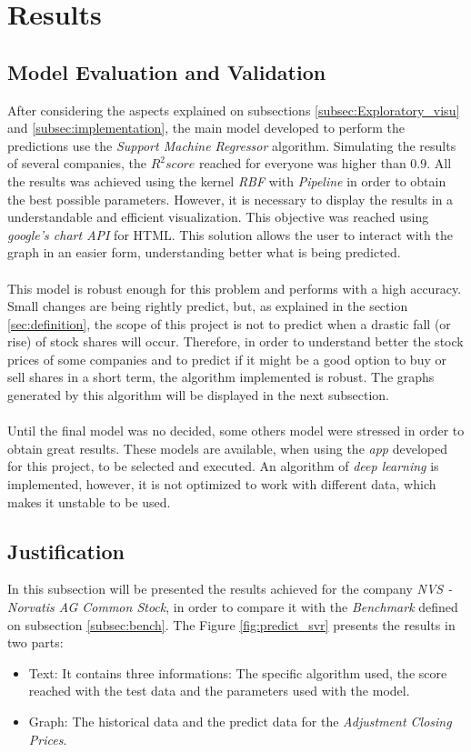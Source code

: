 \section{Results}
\label{sec:results}

\subsection{Model Evaluation and Validation}
After considering the aspects explained on subsections \ref{subsec:Exploratory_visu} and \ref{subsec:implementation}, the main model developed to perform the predictions use the \textit{Support Machine Regressor} algorithm.
Simulating the results of several companies, the $R^2 score$ reached for everyone was higher than 0.9.
All the results was achieved using the kernel \textit{RBF} with \textit{Pipeline} in order to obtain the best possible parameters.
However, it is necessary to display the results in a understandable and efficient visualization. This objective was reached using \textit{google's chart API} for HTML. 
This solution allows the user to interact with the graph in an easier form, understanding better what is being predicted.\\
\\
This model is robust enough for this problem and performs with a high accuracy. Small changes are being rightly predict, but, as explained in the section \ref{sec:definition}, the scope of this project is not to predict when a drastic fall
(or rise) of stock shares will occur. Therefore, in order to understand better the stock prices of some companies and to predict if it might be a good option to buy or sell shares in a short term, the algorithm implemented is robust. 
The graphs generated by this algorithm will be displayed in the next subsection.\\
\\
Until the final model was no decided, some others model were stressed in order to obtain great results. 
These models are available, when using the \textit{app} developed for this project, to be selected and executed. 
An algorithm of \textit{deep learning} is implemented, however, it is not optimized to work with different data, which makes it unstable to be used.


\subsection{Justification}
In this subsection will be presented the results achieved for the company \textit{NVS - Norvatis AG Common Stock}, in order to compare it with the \textit{Benchmark} defined on subsection \ref{subsec:bench}.
The Figure \ref{fig:predict_svr} presents the results in two parts: 
\begin{itemize}
	\item Text: It contains three informations: The specific algorithm used, the  score reached with the test data and the parameters used with the model.\\
	\item Graph: The historical data and the predict data for the \textit{Adjustment Closing Prices}.\\
\end{itemize}

